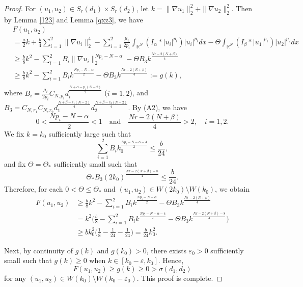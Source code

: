 \documentclass[reqno]{amsart}
\begin{document}
\begin{proof}
For  $(u_1,u_2)\in S_r(d_1)\times S_r(d_2)$, 
let $k=\| \nabla u_1\|_2^2+\| \nabla u_2\|_2^2$. Then
by Lemma \ref{123} and Lemma \ref{qxz3}, we have
\begin{equation}\label{dmk7}
\begin{aligned}
&F(u_1,u_2) \\
&=\frac{a}{2}k+\frac{b}{4}\sum_{i=1}^2\| \nabla u_i\|_2^4-
\sum_{i=1}^2\frac{\mu_i}{2p_i}\int_{\mathbb{R}^N}
 (I_\alpha\ast|u_i|^{p_i})|u_i|^{p_i}dx-\Theta\int_{\mathbb{R}^N}
 (I_\beta\ast|u_1|^{p_1})|u_2|^{p_2}dx\\
&\geq \frac{b}{8}k^2-\sum_{i=1}^2B_i\| \nabla u_i\|_2^{Np_i-N-\alpha}
 -\Theta B_3k^{\frac{Nr-2(N+\beta)}{4}}\\
&\geq \frac{b}{8}k^2-\sum_{i=1}^2B_ik^{\frac{Np_i-N-\alpha}{2}}
 -\Theta B_3k^{\frac{Nr-2(N+\beta)}{4}}:=g(k),\\
\end{aligned}
\end{equation}
where $B_i=\frac{\mu_i}{2p_i}C_{N,p_i}d_i^{\frac{N+\alpha-p_i(N-2)}{2}}$ ($i=1,2$), 
and $B_3=C_{N,r_1}C_{N,r_2}d_1^{\frac{N+\beta-r_1(N-2)}{4}}
d_2^{\frac{N+\beta-r_2(N-2)}{4}}$.
By (A2), we have
\[
0<\frac{Np_i-N-\alpha}{2}<1 \quad \text{and}\quad
  \frac{Nr-2(N+\beta)}{4}>2, \quad i=1,2.
\]
We fix $k=k_0$ sufficiently large such that
\[
\sum_{i=1}^2B_ik_0^{\frac{Np_i-N-\alpha-4}{2}}\leq\frac{b}{24},
\]
and fix $\Theta=\Theta_*$ sufficiently small such that
\[
\Theta_*B_3(2k_0)^{\frac{Nr-2(N+\beta)-8}{4}}\leq\frac{b}{24}.
\]
Therefore, for each $0<\Theta\leq\Theta_*$ and
$(u_1,u_2)\in W(2k_0)\setminus W(k_0)$,
we obtain
\begin{align*}
F(u_1,u_2)
&\geq \frac{b}{8}k^2-\sum_{i=1}^2B_ik^{\frac{Np_i-N-\alpha}{2}}
 -\Theta B_3k^{\frac{Nr-2(N+\beta)}{4}}\\
&= k^2\Big(\frac{b}{8}-\sum_{i=1}^2B_ik^{\frac{Np_i-N-\alpha-4}{2}}
 -\Theta B_3k^{\frac{Nr-2(N+\beta)-8}{4}}\Big)\\
&\geq bk_0^2\Big(\frac{1}{8}-\frac{1}{24}-\frac{1}{24}\Big)
=\frac{b}{24}k_0^2.
\end{align*}

Next, by continuity of $g(k)$ and $g(k_0)>0$, there exists $\varepsilon_0>0$ 
sufficiently small such that $g(k)\geq0$ when $k\in[k_0-\varepsilon,k_0]$. Hence,
\[
F(u_1,u_2)\geq g(k)\geq0>\sigma(d_1,d_2)
\]
for any $(u_1,u_2)\in\overline{W(k_0)}\setminus W(k_0-\varepsilon_0)$.
This proof is complete.
\end{proof}
\end{document}
